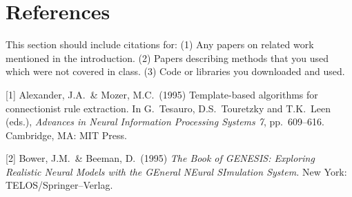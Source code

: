 \documentclass{article}
\begin{document}
\section*{References}
This section should include citations for: (1) Any papers on related work mentioned in the introduction.
(2) Papers describing methods that you used which were not covered in class.
(3) Code or libraries you downloaded and used.

\medskip
\small
[1] Alexander, J.A.\ \& Mozer, M.C.\ (1995) Template-based algorithms
for connectionist rule extraction. In G.\ Tesauro, D.S.\ Touretzky and
T.K.\ Leen (eds.), {\it Advances in Neural Information Processing
  Systems 7}, pp.\ 609--616. Cambridge, MA: MIT Press.

[2] Bower, J.M.\ \& Beeman, D.\ (1995) {\it The Book of GENESIS:
  Exploring Realistic Neural Models with the GEneral NEural SImulation
  System.}  New York: TELOS/Springer--Verlag.
\end{document}
